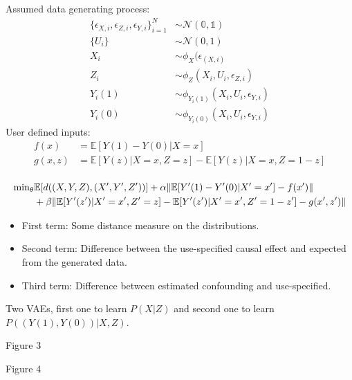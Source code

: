 \documentclass{beamer}
\DeclarePairedDelimiter\norm{\lVert}{\rVert}%
\begin{document}
\begin{frame}
	Assumed data generating process:
	\begin{equation}
		\begin{split}
			\{ \epsilon_{X, i}, \epsilon_{Z, i}, \epsilon_{Y, i} \}_{i=1}^N & \sim \mathcal{N}(\mathbb{0}, \mathbb{1}) \\
			\{ U_i \} & \sim \mathcal{N}(0, 1) \\
			X_i & \sim \phi_X(\epsilon_(X, i) \\
			Z_i & \sim \phi_Z(X_i, U_i, \epsilon_{Z, i}) \\
			Y_i(1) & \sim \phi_{Y_i(1)} (X_i, U_i, \epsilon_{Y, i}) \\
			Y_i(0) & \sim \phi_{Y_i(0)} (X_i, U_i, \epsilon_{Y, i})
		\end{split}
	\end{equation}
	User defined inputs:
	\begin{equation}
		\begin{split}
			f(x) &= \mathbb{E}[Y(1) - Y(0) | X=x] \\
			g(x, z) &= \mathbb{E}[Y(z) | X=x, Z=z] - \mathbb{E}[Y(z) | X=x, Z=1-z] \\
		\end{split}
	\end{equation}
\end{frame}
\begin{frame}
	\begin{equation}
		\begin{split}
			\mathbf{\min}_{\theta} & \mathbb{E}[d((X, Y, Z), (X', Y', Z'))] + \alpha \norm{\mathbb{E}[Y'(1) - Y'(0) | X' = x'] -f(x') } \\
						& + \beta \norm{\mathbb{E}[Y'(z') | X'=x', Z'=z] - \mathbb{E}[Y'(z') | X'=x', Z'=1-z'] -g(x', z')}
		\end{split}
	\end{equation}

	\begin{itemize}
		\item First term: Some distance measure on the distributions.
		\item Second term: Difference between the use-specified causal effect and expected from the generated data.
		\item Third term: Difference between estimated confounding and use-specified.
	\end{itemize}
	Two VAEs, first one to learn $ P(X | Z) $ and second one to learn $ P((Y(1), Y(0)) | X, Z) $.
\end{frame}
\begin{frame}
Figure 3
\end{frame}
\begin{frame}
Figure 4
\end{frame}
\end{document}
